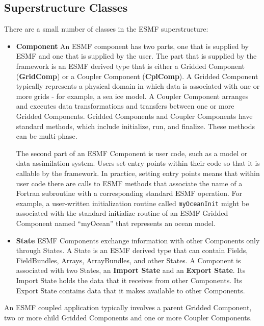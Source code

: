 \subsection{Superstructure Classes}

There are a small number of classes in the ESMF superstructure:

\begin{itemize}
\item {\bf Component}  An ESMF component has two parts, one that is 
supplied by ESMF and one that is supplied by the user.  The
part that is supplied by the framework is an ESMF derived type that
is either a Gridded Component ({\bf GridComp}) or a Coupler 
Component ({\bf CplComp}).  A Gridded Component typically represents
a physical domain in which data is associated with one or more 
grids - for example, a sea ice model.  A Coupler Component 
arranges and executes data transformations and transfers between
one or more Gridded Components. Gridded Components and Coupler 
Components have standard methods, which include initialize, run,
and finalize.  These methods can be multi-phase.

The second part of an ESMF Component is user code, such as a
model or data assimilation system.  Users set entry points 
within their code so that it is callable by the framework.  
In practice, setting entry points means that within user code 
there are calls to ESMF methods that associate the name of a 
Fortran subroutine with a corresponding standard ESMF operation.  
For example, a user-written initialization routine called 
{\tt myOceanInit} might be associated with the standard 
initialize routine of an ESMF Gridded Component named ``myOcean'' 
that represents an ocean model.

\item {\bf State}  ESMF Components exchange information with other 
Components only through States.  A State is an ESMF derived
type that can contain Fields, FieldBundles, Arrays, ArrayBundles,
and other States.  A Component is associated with two States, an 
{\bf Import State} and an {\bf Export State}.  Its Import State 
holds the data that it receives from other Components.  
Its Export State contains data that it makes available to 
other Components. 

\end{itemize}

An ESMF coupled application typically involves a parent Gridded Component, 
two or more child Gridded Components and one or more Coupler 
Components. 

